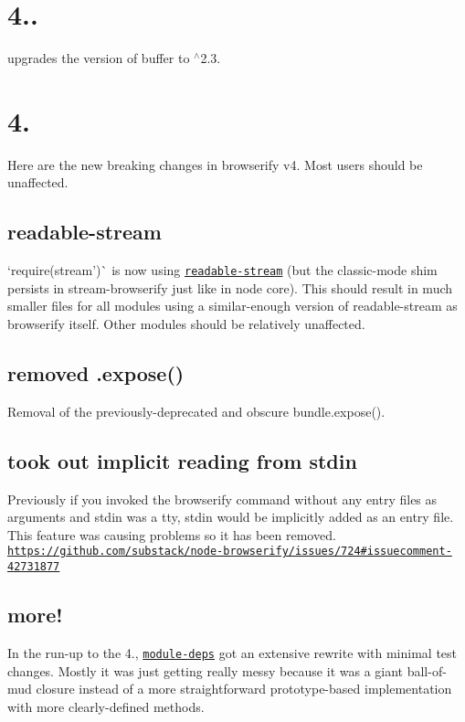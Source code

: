 \section*{4..}

upgrades the version of buffer to $^\wedge$2.3.

\section*{4.}

Here are the new breaking changes in browserify v4. Most users should be unaffected.

\subsection*{readable-\/stream}

`require(\textquotesingle{}stream')\`{} is now using \href{https://npmjs.org/package/readable-stream}{\tt readable-\/stream} (but the classic-\/mode shim persists in stream-\/browserify just like in node core). This should result in much smaller files for all modules using a similar-\/enough version of readable-\/stream as browserify itself. Other modules should be relatively unaffected.

\subsection*{removed .expose()}

Removal of the previously-\/deprecated and obscure {\ttfamily bundle.\+expose()}.

\subsection*{took out implicit reading from stdin}

Previously if you invoked the browserify command without any entry files as arguments and stdin was a tty, stdin would be implicitly added as an entry file. This feature was causing problems so it has been removed. \href{https://github.com/substack/node-browserify/issues/724#issuecomment-42731877}{\tt https\+://github.\+com/substack/node-\/browserify/issues/724\#issuecomment-\/42731877}

\subsection*{more!}

In the run-\/up to the 4., \href{https://npmjs.org/package/module-deps}{\tt module-\/deps} got an extensive rewrite with minimal test changes. Mostly it was just getting really messy because it was a giant ball-\/of-\/mud closure instead of a more straightforward prototype-\/based implementation with more clearly-\/defined methods.

